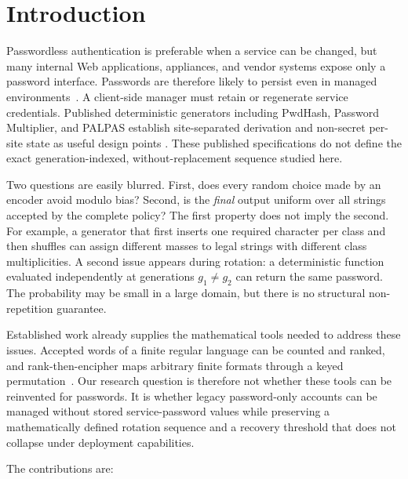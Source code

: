 \documentclass[preprint,12pt]{elsarticle}
\begin{document}
\section{Introduction}

Passwordless authentication is preferable when a service can be changed, but
many internal Web applications, appliances, and vendor systems expose only a
password interface. Passwords are therefore likely to persist even in managed
environments~\cite{herley2012persistence}. A client-side manager must retain or
regenerate service credentials. Published deterministic generators including
PwdHash, Password Multiplier, and PALPAS establish site-separated derivation
and non-secret per-site state as useful design points
\cite{ross2005pwdhash,halderman2005multiplier,palpas}. These published
specifications do not define the exact generation-indexed,
without-replacement sequence studied here.

Two questions are easily blurred. First, does every random choice made by an
encoder avoid modulo bias? Second, is the \emph{final} output uniform over all
strings accepted by the complete policy? The first property does not imply the
second. For example, a generator that first inserts one required character per
class and then shuffles can assign different masses to legal strings with
different class multiplicities. A second issue appears during rotation: a
deterministic function evaluated independently at generations $g_1\ne g_2$
can return the same password. The probability may be small in a large domain,
but there is no structural non-repetition guarantee.

Established work already supplies the mathematical tools needed to address
these issues. Accepted words of a finite regular language can be counted and
ranked, and rank-then-encipher maps arbitrary finite formats through a keyed
permutation~\cite{goldberg1985ranking,black2002finite,bellare2009fpe}. Our
research question is therefore not whether these tools can be reinvented for
passwords. It is whether legacy password-only accounts can be managed without
stored service-password values while preserving a mathematically defined
rotation sequence and a recovery threshold that does not collapse under
deployment capabilities.

The contributions are:
\end{document}
